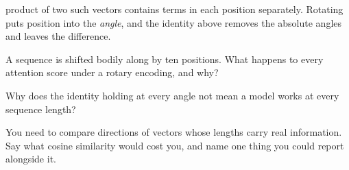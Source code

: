 \begin{furtherproblems}
{  product of two such vectors contains terms in each position separately.
  Rotating puts position into the \emph{angle}, and the identity above removes
  the absolute angles and leaves the difference.}
\item A sequence is shifted bodily along by ten positions. What happens to
  every attention score under a rotary encoding, and why?
\item Why does the identity holding at every angle not mean a model works at
  every sequence length?
\item You need to compare directions of vectors whose lengths carry real
  information. Say what cosine similarity would cost you, and name one thing
  you could report alongside it.
\end{furtherproblems}
